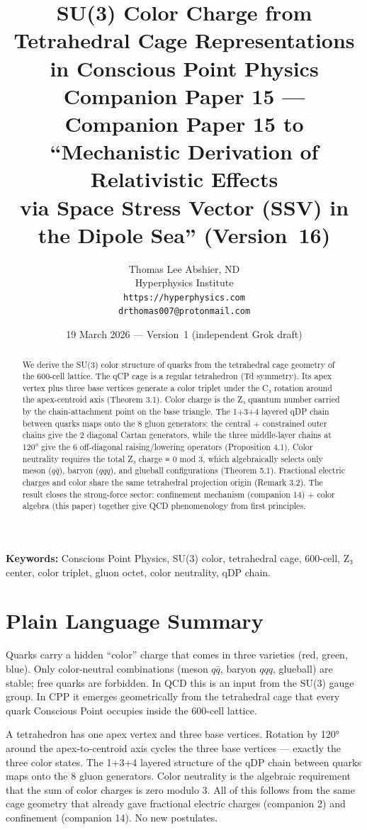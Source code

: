 \documentclass[12pt]{article}
\title{\textbf{SU(3) Color Charge from Tetrahedral Cage Representations\\
in Conscious Point Physics}\\[6pt]
{\large Companion Paper 15 ---
Companion Paper 15 to ``Mechanistic Derivation of Relativistic Effects\\
via Space Stress Vector (SSV) in the Dipole Sea'' (Version~16)}}
\author{Thomas Lee Abshier, ND\\
Hyperphysics Institute\\
\texttt{https://hyperphysics.com}\\
\texttt{drthomas007@protonmail.com}}
\date{19 March 2026 --- Version~1 (independent Grok draft)}
\begin{document}
\maketitle

\noindent\textbf{Keywords:} Conscious Point Physics, SU(3) color, tetrahedral cage, 600-cell, Z₃ center, color triplet, gluon octet, color neutrality, qDP chain.

\section*{Plain Language Summary}

Quarks carry a hidden “color” charge that comes in three varieties (red, green, blue). Only color-neutral combinations (meson \(q\bar{q}\), baryon \(qqq\), glueball) are stable; free quarks are forbidden. In QCD this is an input from the SU(3) gauge group. In CPP it emerges geometrically from the tetrahedral cage that every quark Conscious Point occupies inside the 600-cell lattice.

A tetrahedron has one apex vertex and three base vertices. Rotation by 120° around the apex-to-centroid axis cycles the three base vertices — exactly the three color states. The 1+3+4 layered structure of the qDP chain between quarks maps onto the 8 gluon generators. Color neutrality is the algebraic requirement that the sum of color charges is zero modulo 3. All of this follows from the same cage geometry that already gave fractional electric charges (companion 2) and confinement (companion 14). No new postulates.

\begin{abstract}
We derive the SU(3) color structure of quarks from the tetrahedral cage geometry of the 600-cell lattice. The qCP cage is a regular tetrahedron (Td symmetry). Its apex vertex plus three base vertices generate a color triplet under the C₃ rotation around the apex-centroid axis (Theorem 3.1). Color charge is the Z₃ quantum number carried by the chain-attachment point on the base triangle. The 1+3+4 layered qDP chain between quarks maps onto the 8 gluon generators: the central + constrained outer chains give the 2 diagonal Cartan generators, while the three middle-layer chains at 120° give the 6 off-diagonal raising/lowering operators (Proposition 4.1). Color neutrality requires the total Z₃ charge ≡ 0 mod 3, which algebraically selects only meson (\(q\bar{q}\)), baryon (\(qqq\)), and glueball configurations (Theorem 5.1). Fractional electric charges and color share the same tetrahedral projection origin (Remark 3.2). The result closes the strong-force sector: confinement mechanism (companion 14) + color algebra (this paper) together give QCD phenomenology from first principles.
\end{abstract}
\end{document}
